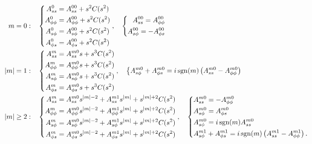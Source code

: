 \begin{equation}
\begin{aligned}
    m = 0 :& \quad \left\{\begin{aligned}
        A_{ss}^0 &= A_{ss}^{00} + s^2 C(s^2) \\ 
        A_{\phi\phi}^0 &= A_{\phi\phi}^{00} + s^2 C(s^2) \\ 
        A_{s\phi}^0 &= A_{s\phi}^{00} + s^2 C(s^2) \\ 
        A_{\phi s}^0 &= A_{\phi s}^{00} + s^2 C(s^2) \\ 
    \end{aligned}\right.,\quad 
    \left\{\begin{aligned}
        A_{ss}^{00} = A_{\phi\phi}^{00} \\ 
        A_{s\phi}^{00} = -A_{\phi s}^{00}
    \end{aligned}\right. \\ 
    |m| = 1 :& \quad \left\{\begin{aligned}
        A_{ss}^m &= A_{ss}^{m0} s + s^3 C(s^2) \\
        A_{\phi\phi}^m &= A_{\phi\phi}^{m0} s + s^{3} C(s^2) \\
        A_{s\phi}^m &= A_{s\phi}^{m0} s + s^{3} C(s^2) \\
        A_{\phi s}^m &= A_{\phi s}^{m0} s + s^{3} C(s^2) \\
    \end{aligned}\right.,\quad \left\{\begin{aligned}
        &A_{s\phi}^{m0} + A_{\phi s}^{m0} = i\operatorname{sgn}(m) \left(A_{ss}^{m0} - A_{\phi\phi}^{m0}\right)
    \end{aligned}\right. \\
    |m| \geq 2 :& \quad \left\{\begin{aligned}
        A_{ss}^m &= A_{ss}^{m0} s^{|m|-2} + A_{ss}^{m1} s^{|m|} + s^{|m|+2} C(s^2) \\
        A_{\phi\phi}^m &= A_{\phi\phi}^{m0} s^{|m|-2} + A_{\phi \phi}^{m1} s^{|m|} + s^{|m|+2} C(s^2) \\
        A_{s\phi}^m &= A_{s\phi}^{m0} s^{|m|-2} + A_{s\phi}^{m1} s^{|m|} + s^{|m|+2} C(s^2) \\
        A_{\phi s}^m &= A_{\phi s}^{m0} s^{|m|-2} + A_{\phi s}^{m1} s^{|m|} + s^{|m|+2} C(s^2) \\
    \end{aligned}\right.,\quad \left\{\begin{aligned}
        &A_{ss}^{m0} = - A_{\phi\phi}^{m0}\\
        &A_{s\phi}^{m0} = A_{\phi s}^{m0} \\ 
        &A_{s\phi}^{m0} = i \operatorname{sgn}(m) A_{ss}^{m0} \\ 
        &A_{s\phi}^{m1} + A_{\phi s}^{m1} = i\operatorname{sgn}(m)\left(A_{ss}^{m1} - A_{\phi\phi}^{m1}\right).
    \end{aligned}\right.
\end{aligned}
\end{equation}
